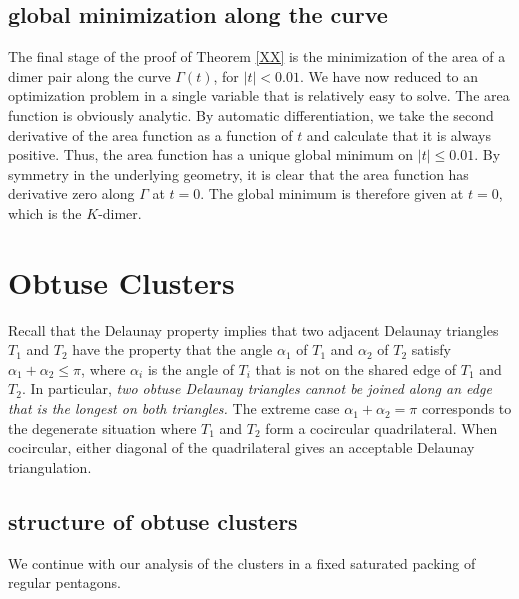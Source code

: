 \subsection{global minimization along the curve}

The final stage of the proof of Theorem \ref{XX} is the minimization of the area of a dimer pair along the
curve $\Gamma(t)$, for $|t|<0.01$.    We have now reduced to an optimization problem in a single variable 
that is relatively easy to solve.  The area function is obviously analytic.
By automatic differentiation, we take the second derivative of the area
function as a function of $t$ and calculate that it is always positive.  Thus, the area function has a unique
global minimum on $|t|\le 0.01$.  
By symmetry in the underlying geometry, 
it is clear that the area function has derivative zero along $\Gamma$ at
$t=0$.  The global minimum is therefore given at $t=0$, which is the $K$-dimer.

\section{Obtuse Clusters}\label{sec:obtuse}



\begin{remark}\label{rem:delaunay}
  Recall that the Delaunay property implies that two adjacent Delaunay
  triangles $T_1$ and $T_2$ have the property that the angle
  $\alpha_1$ of $T_1$ and $\alpha_2$ of $T_2$ satisfy $\alpha_1 +
  \alpha_2\le \pi$, where $\alpha_i$ is the angle of $T_i$ that is not
  on the shared edge of $T_1$ and $T_2$.  In particular, {\it two
    obtuse Delaunay triangles cannot be joined along an edge that is
    the longest on both triangles.}  The extreme case
  $\alpha_1+\alpha_2=\pi$ corresponds to the degenerate situation
  where $T_1$ and $T_2$ form a cocircular quadrilateral. When
  cocircular, either diagonal of the quadrilateral gives an acceptable
  Delaunay triangulation.
\end{remark}

\subsection{structure of obtuse clusters}

We continue with our analysis of the clusters in a fixed saturated
packing of regular pentagons.  

